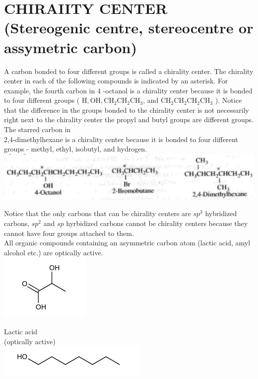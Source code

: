 \documentclass[10pt]{article}
\begin{document}
\section*{CHIRAIITY CENTER (Stereogenic centre, stereocentre or assymetric carbon)}
A carbon bonded to four different groups is called a chirality center. The chirality center in each of the following compounds is indicated by an asterisk. For example, the fourth carbon in 4 -octanol is a chirality center because it is bonded to four different groups ( $\mathrm{H}, \mathrm{OH}, \mathrm{CH}_{2} \mathrm{CH}_{2} \mathrm{CH}_{3}$, and $\mathrm{CH}_{2} \mathrm{CH}_{2} \mathrm{CH}_{2} \mathrm{CH}_{3}$ ). Notice that the difference in the groups bonded to the chirality center is not necessarily right next to the chirality center the propyl and butyl groups are different groups. The starred carbon in\\
2,4-dimethylhexane is a chirality center because it is bonded to four different groups - methyl, ethyl, isobutyl, and hydrogen.\\
\includegraphics[max width=\textwidth, center]{2025_01_28_8470952b98110cec3aabg-049(2)}

Notice that the only carbons that can be chirality centers are $s p^{3}$ hybridized carbons, $s p^{2}$ and $s p$ hyrbidized carbons cannot be chirality centers because they cannot have four groups attached to them.\\
All organic compounds containing an asymmetric carbon atom (lactic acid, amyl alcohol etc.) are optically active.\\
\includegraphics{smile-650680ea7e847903e0783e6e5823556e9354338d}

Lactic acid\\
(optically active)\\
\includegraphics{smile-dfc3575b94b8d58601b8fe8079df9a141e6bb852}
\end{document}
